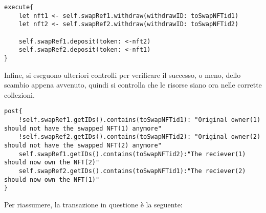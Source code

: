 \begin{lstlisting}[style=all, style=cadence]
execute{
    let nft1 <- self.swapRef1.withdraw(withdrawID: toSwapNFTid1)
    let nft2 <- self.swapRef2.withdraw(withdrawID: toSwapNFTid2)
    
    self.swapRef1.deposit(token: <-nft2)
    self.swapRef2.deposit(token: <-nft1)
}
\end{lstlisting}

Infine, si eseguono ulteriori controlli per verificare il successo, o meno, dello scambio appena avvenuto, quindi si controlla che le risorse siano ora nelle corrette collezioni.

\begin{lstlisting}[style=all, style=cadence]
post{
    !self.swapRef1.getIDs().contains(toSwapNFTid1): "Original owner(1) should not have the swapped NFT(1) anymore"
    !self.swapRef2.getIDs().contains(toSwapNFTid2): "Original owner(2) should not have the swapped NFT(2) anymore"
    self.swapRef1.getIDs().contains(toSwapNFTid2):"The reciever(1) should now own the NFT(2)"
    self.swapRef2.getIDs().contains(toSwapNFTid1):"The reciever(2) should now own the NFT(1)"
}
\end{lstlisting}

Per riassumere, la transazione in questione è la seguente:

